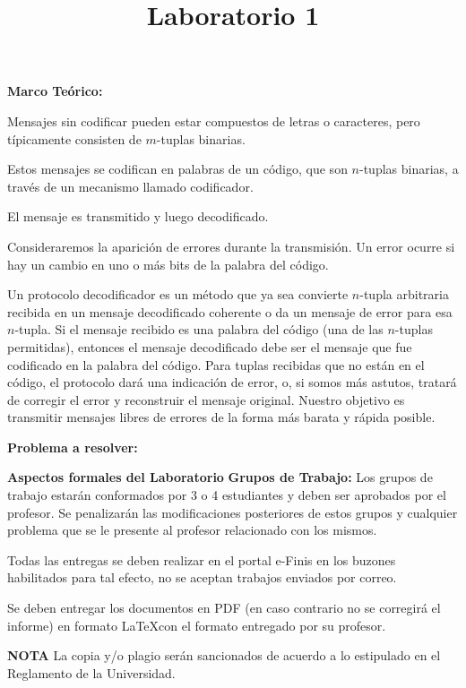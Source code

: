 \documentclass[a4paper]{article}
\title{Laboratorio 1}
\date{}
\begin{document}
\maketitle
\thispagestyle{fancy}

\textbf{Marco Teórico:}
\vspace{0.2 cm}

Mensajes sin codificar pueden estar compuestos de letras o caracteres, pero típicamente consisten de 
$m$-tuplas binarias. 

Estos mensajes se codifican en palabras de un código, que son $n$-tuplas binarias, a través de un mecanismo llamado codificador. 

El mensaje es transmitido y luego decodificado. 

Consideraremos la aparición de errores durante la transmisión. Un error ocurre si hay un cambio en uno o más bits de la palabra del código. 

Un protocolo decodificador es un método que ya sea convierte $n$-tupla arbitraria recibida en un mensaje decodificado coherente o da un mensaje de error para esa $n$-tupla. Si el mensaje recibido es una palabra del código (una de las $n$-tuplas permitidas), entonces el mensaje decodificado debe ser el mensaje que fue codificado en la palabra del código. Para tuplas recibidas que no están en el código, el protocolo dará una indicación de error, o, si somos más astutos, tratará de corregir el error y reconstruir el mensaje original. Nuestro objetivo es transmitir mensajes libres de errores de la forma más barata y rápida posible.

\begin{itemize}

\end{itemize}

\textbf{Problema a resolver:}
\vspace{0.2 cm}




\begin{enumerate}

\end{enumerate}


\textbf{Aspectos formales del Laboratorio}
{\bf{Grupos de Trabajo}:} Los grupos de trabajo estarán conformados por 3 o 4 estudiantes y
deben ser aprobados por el profesor. Se penalizarán las modificaciones posteriores de
estos grupos y cualquier problema que se le presente al profesor relacionado con los
mismos.
\vspace*{.5cm}

Todas las entregas se deben realizar en el portal e-Finis en los buzones habilitados para
tal efecto, no se aceptan trabajos enviados por correo. 

\vspace*{.5cm}

Se deben entregar los documentos en PDF (en caso contrario no se corregirá el informe)
en formato \LaTeX  con el formato entregado por su profesor.



{\bf{NOTA}}
La copia y/o plagio serán sancionados de acuerdo a lo estipulado en el Reglamento de la
Universidad.
\end{document}

